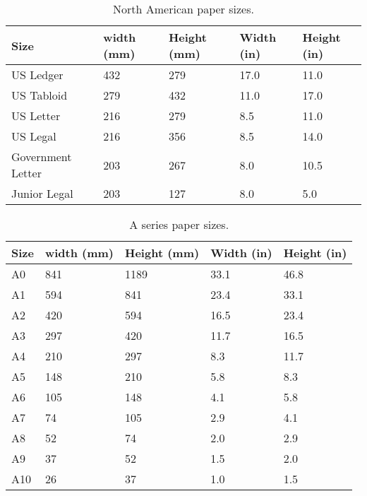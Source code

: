 \documentclass[a5paper]{scrbook}
\begin{document}
\setlength\paperwidth@cx{\paperwidth}
\setlength\paperheight@cx{\paperheight}
\setlength\bindingcorrection{0.25in}

\pgfmathsetmacro{}
\pgfmathsetmacro{}

\drawclassicspread

\drawtriallayout

\newpage\clearpage

\drawtriallayout


\printgeometryvalues

\readability

\newpage
\begin{table}[ht]
\caption{North American paper sizes.}
\begin{tabular}{lllll}
\toprule
Size &width (mm)  &Height (mm)  &Width (in) &Height (in)\\
\midrule
US Ledger   &432 &279 & 17.0 &11.0\\
US Tabloid &279 & 432 & 11.0 &17.0\\
US Letter  &216 & 279 & 8.5 &11.0\\
US Legal   &216 &356 & 8.5 & 14.0\\
Government Letter &203 & 267 & 8.0 &10.5\\
Junior Legal &203 & 127 & 8.0 & 5.0\\
\bottomrule
\end{tabular}
\end{table}

\clearpage

\begin{table}[ht]
\caption{A series paper sizes.}
\begin{tabular}{lllll}
\toprule
Size &width (mm)  &Height (mm)  &Width (in) &Height (in)\\
\midrule
A0   &841 &1189 &33.1 & 46.8\\
A1   &594 & 841 &23.4 & 33.1\\
A2   & 420 & 594 &16.5 &23.4\\
A3   &297 & 420 &11.7 &16.5\\
A4   &210 &297 &8.3 &11.7\\ 
A5   &148 & 210 &5.8 & 8.3\\
A6   &105 & 148 & 4.1 & 5.8\\
A7   & 74 & 105 & 2.9 & 4.1\\
A8   &52 & 74 & 2.0 & 2.9\\
A9   &37 & 52 & 1.5 & 2.0\\
A10  & 26 & 37 & 1.0 & 1.5\\
\bottomrule
\end{tabular}
\end{table}
\end{document}
